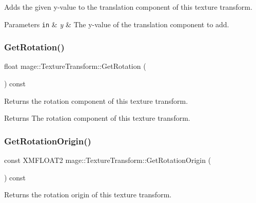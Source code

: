 Adds the given y-\/value to the translation component of this texture transform.


\begin{DoxyParams}[1]{Parameters}
\mbox{\tt in}  & {\em y} & The y-\/value of the translation component to add. \\
\hline
\end{DoxyParams}
\hypertarget{structmage_1_1_texture_transform_a2c401693796a1d1b6a5480197fde5de1}{}\label{structmage_1_1_texture_transform_a2c401693796a1d1b6a5480197fde5de1} 
\subsubsection{\texorpdfstring{Get\+Rotation()}{GetRotation()}}
{\footnotesize\ttfamily float mage\+::\+Texture\+Transform\+::\+Get\+Rotation (\begin{DoxyParamCaption}{ }\end{DoxyParamCaption}) const\hspace{0.3cm}{\ttfamily [noexcept]}}

Returns the rotation component of this texture transform.

\begin{DoxyReturn}{Returns}
The rotation component of this texture transform. 
\end{DoxyReturn}
\hypertarget{structmage_1_1_texture_transform_ad23596d5d9bc99978c3bc0f54c280dec}{}\label{structmage_1_1_texture_transform_ad23596d5d9bc99978c3bc0f54c280dec} 
\subsubsection{\texorpdfstring{Get\+Rotation\+Origin()}{GetRotationOrigin()}}
{\footnotesize\ttfamily const X\+M\+F\+L\+O\+A\+T2 mage\+::\+Texture\+Transform\+::\+Get\+Rotation\+Origin (\begin{DoxyParamCaption}{ }\end{DoxyParamCaption}) const\hspace{0.3cm}{\ttfamily [noexcept]}}

Returns the rotation origin of this texture transform.


